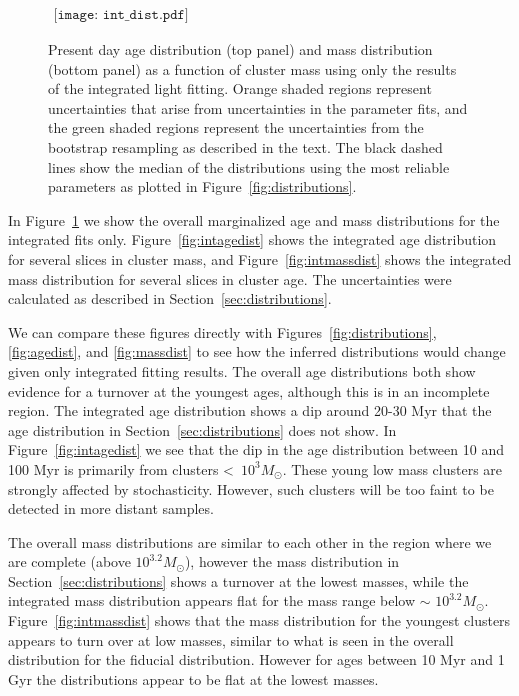 \documentclass{emulateapj}
\begin{document}
\begin{figure}[ht!]
   \begin{center}$
      \begin{array}{cc}
         \texttt{[image: int\_dist.pdf]} 
      \end{array}$
   \end{center}
  \caption{Present day age distribution (top panel) and mass distribution (bottom panel) as a function of cluster mass using only the results of the integrated light fitting.  Orange shaded regions represent uncertainties that arise from uncertainties in the parameter fits, and the green shaded regions represent the uncertainties from the bootstrap resampling as described in the text.  The black dashed lines show the median of the distributions using the most reliable parameters as plotted in Figure~\ref{fig:distributions}.}
  \label{fig:intdist}
\end{figure}


In Figure~\ref{fig:intdist} we show the overall marginalized age and mass distributions for the integrated fits only.  Figure~\ref{fig:intagedist} shows the integrated age distribution for several slices in cluster mass, and Figure~\ref{fig:intmassdist} shows the integrated mass distribution for several slices in cluster age.  The uncertainties were calculated as described in Section~\ref{sec:distributions}.

We can compare these figures directly with Figures~\ref{fig:distributions}, \ref{fig:agedist}, and \ref{fig:massdist} to see how the inferred distributions would change given only integrated fitting results.  The overall age distributions both show evidence for a turnover at the youngest ages, although this is in an incomplete region.  The integrated age distribution shows a dip around 20-30 Myr that the age distribution in Section~\ref{sec:distributions} does not show.  In Figure~\ref{fig:intagedist} we see that the dip in the age distribution between 10 and 100 Myr is primarily from clusters \textless\ $10^3 M_{\odot}$.  These young low mass clusters are strongly affected by stochasticity.  However, such clusters will be too faint to be detected in more distant samples.

The overall mass distributions are similar to each other in the region where we are complete (above $10^{3.2} M_{\odot}$), however the mass distribution in Section~\ref{sec:distributions} shows a turnover at the lowest masses, while the integrated mass distribution appears flat for the mass range below $\sim$ $10^{3.2} M_{\odot}$.  Figure~\ref{fig:intmassdist} shows that the mass distribution for the youngest clusters appears to turn over at low masses, similar to what is seen in the overall distribution for the fiducial distribution.  However for ages between 10 Myr and 1 Gyr the distributions appear to be flat at the lowest masses.  
\end{document}
